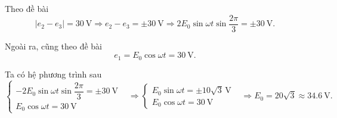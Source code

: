 \begin{enumerate}[label=\bfseries Câu \arabic*:]
{	Theo đề bài
	\begin{equation*}
		\left| {{e}_{2}}-{{e}_{3}} \right|=\SI{30}{\volt}
		\Rightarrow {{e}_{2}}-{{e}_{3}}=\pm \SI{30}{\volt}
		\Rightarrow 2{{E}_{0}}\sin \omega t\sin \frac{2\pi }{3}=\pm \SI{30}{\volt}.
	\end{equation*}
	
	Ngoài ra, cũng theo đề bài
	\begin{equation*}
		{{e}_{1}}={{E}_{0}}\cos \omega t =\SI{30}{\volt}.
	\end{equation*}
	
	Ta có hệ phương trình sau
	\begin{equation*}
		\left\{\begin{array}{ll}{-2{{E}_{0}}\sin \omega t\sin \dfrac{2\pi}{3}=\pm \SI{30}{\volt}}&\\{{{E}_{0}}\cos \omega t=\SI{30}{\volt}}&\end{array}\right.
		\Rightarrow \left\{\begin{array}{ll}{{{E}_{0}}\sin \omega t=\pm 10\sqrt{3}\,\text{V}}&\\{{{E}_{0}}\cos \omega t=\SI{30}{\volt}}&\end{array}\right.
		\Rightarrow {{E}_{0}}=20\sqrt{3}\approx \SI{34,6}{\volt}.
	\end{equation*}
}
\end{enumerate}
